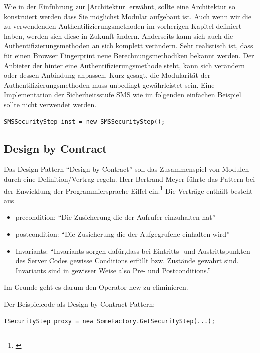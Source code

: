 Wie in der Einführung zur {[}Architektur{]} erwähnt, sollte eine
Architektur so konstruiert werden dass Sie möglichst Modular aufgebaut
ist. Auch wenn wir die zu verwendenden Authentifizierungsmethoden im
vorherigen Kapitel definiert haben, werden sich diese in Zukunft ändern.
Anderseits kann sich auch die Authentifizierungsmethoden an sich
komplett verändern. Sehr realistisch ist, dass für einen Browser
Fingerprint neue Berechnungsmethodiken bekannt werden. Der Anbieter der
hinter eine Authentifizierungsmethode steht, kann sich verändern oder
dessen Anbindung anpassen. Kurz gesagt, die Modularität der
Authentifizierungsmethoden muss unbedingt gewährleistet sein. Eine
Implementation der Sicherheitsstufe SMS wie im folgenden einfachen
Beispiel sollte nicht verwendet werden.

\begin{verbatim}
SMSSecurityStep inst = new SMSSecurityStep();
\end{verbatim}

\subsection{Design by Contract}\label{design-by-contract}

Das Design Pattern ``Design by Contract'' soll das Zusammenspiel von
Modulen durch eine Definition/Vertrag regeln. Herr Bertrand Meyer führte
das Pattern bei der Enwicklung der Programmiersprache Eiffel
ein.\footnote{\autocite{design-By-Contract}} Die Verträge enthält
besteht aus

\begin{itemize}
\tightlist
\item
  precondition: ``Die Zusicherung die der Aufrufer einzuhalten hat''
\item
  postcondition: ``Die Zusicherung die der Aufgegrufene einhalten wird''
\item
  Invariants: ``Invariants sorgen dafür,dass bei Eintritts- und
  Austrittspunkten des Server Codes gewisse Conditions erfüllt bzw.
  Zustände gewahrt sind. Invariants sind in gewisser Weise also Pre- und
  Postconditions.''
\end{itemize}

Im Grunde geht es darum den Operator new zu eliminieren.

Der Beispielcode als Design by Contract Pattern:

\begin{verbatim}
ISecurityStep proxy = new SomeFactory.GetSecurityStep(...);
\end{verbatim}

